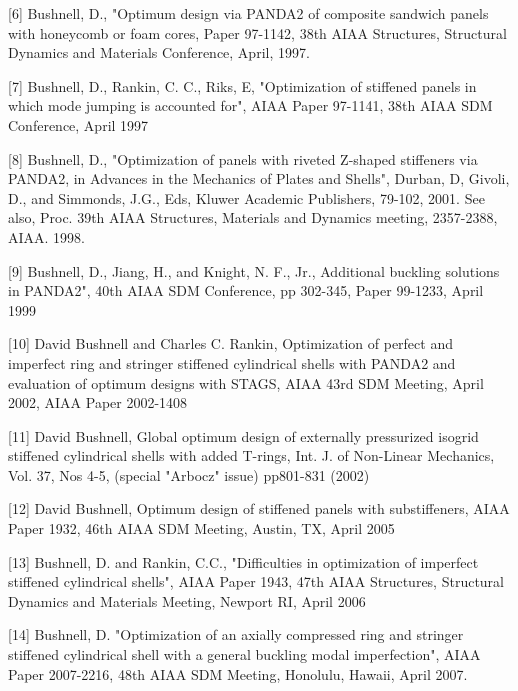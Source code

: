 [6] Bushnell, D., "Optimum design via PANDA2 of composite sandwich
panels with honeycomb or foam cores,  Paper 97-1142, 38th AIAA Structures,
Structural Dynamics and Materials Conference, April, 1997.

[7] Bushnell, D., Rankin, C. C., Riks, E, "Optimization of stiffened
panels in which mode jumping is accounted for", AIAA Paper 97-1141, 38th
AIAA SDM Conference, April 1997 

[8] Bushnell, D., "Optimization of panels with riveted Z-shaped
stiffeners via PANDA2, in Advances in the Mechanics of Plates and
Shells", Durban, D, Givoli, D., and Simmonds, J.G., Eds, Kluwer
Academic Publishers,  79-102, 2001. See also,  Proc. 39th AIAA
Structures, Materials and Dynamics meeting, 2357-2388, AIAA. 1998. 

[9] Bushnell, D., Jiang, H., and Knight, N. F., Jr., Additional buckling
solutions in PANDA2", 40th AIAA SDM Conference, pp 302-345, Paper 99-1233,
April 1999

[10] David Bushnell and Charles C. Rankin, Optimization of perfect and
imperfect ring and stringer stiffened cylindrical shells with PANDA2 and
evaluation of optimum designs with STAGS, AIAA 43rd SDM Meeting, April
2002, AIAA Paper 2002-1408

[11] David Bushnell, Global optimum design of externally pressurized
isogrid stiffened cylindrical shells with added T-rings, Int. J. of
Non-Linear Mechanics, Vol. 37, Nos 4-5, (special "Arbocz" issue)
pp801-831 (2002)

[12] David Bushnell, Optimum design of stiffened panels with substiffeners,
AIAA Paper 1932, 46th AIAA SDM Meeting, Austin, TX, April 2005

[13] Bushnell, D. and Rankin, C.C.,
"Difficulties in optimization of imperfect stiffened
cylindrical shells",
AIAA Paper 1943, 47th AIAA Structures, Structural Dynamics and
Materials Meeting, Newport RI, April 2006

[14] Bushnell, D.
"Optimization of an axially compressed ring and stringer stiffened
cylindrical shell with a general buckling modal imperfection",
AIAA Paper 2007-2216, 48th AIAA SDM Meeting, Honolulu, Hawaii,
April 2007.

